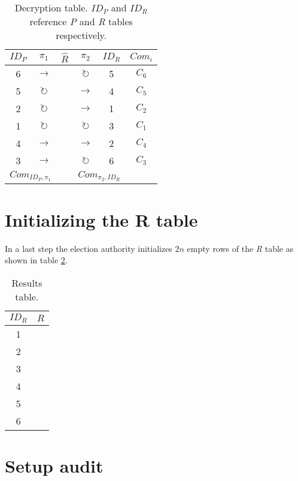 \begin{table}
	\centering
	\begin{tabular}{|c|c|c|c|c|c|}
		\hline
		$ID_P$ & $\pi_1$ & $\hat{R}$ & $\pi_2$ & $ID_R$ & $Com_{i}$ \\
		\hline
		6 & $\rightarrow$       & & $\circlearrowright$ & 5 & $C_6$ \\
		5 & $\circlearrowright$ & & $\rightarrow$       & 4 & $C_5$ \\
		2 & $\circlearrowright$ & & $\rightarrow$       & 1 & $C_2$ \\
		1 & $\circlearrowright$ & & $\circlearrowright$ & 3 & $C_1$ \\
		4 & $\rightarrow$       & & $\rightarrow$       & 2 & $C_4$ \\
		3 & $\rightarrow$       & & $\circlearrowright$ & 6 & $C_3$ \\
		\hline
		\multicolumn{2}{|c|}{$Com_{ID_P, \pi_1}$} &   & \multicolumn{2}{c|}{$Com_{\pi_2, ID_R}$} & \\
		\hline
	\end{tabular}
	\caption{Decryption table. $ID_P$ and $ID_R$ reference \emph{P} and \emph{R} tables respectively.}
	\label{tbl:d_table_full}
\end{table}

\section{Initializing the \textbf{R} table}

In a last step the election authority initializes $2n$ empty rows of the
\emph{R} table as shown in table \ref{tbl:r_table_full}.

\begin{table}
	\centering
	\begin{tabular}{|c|c|}
		\hline
		$ID_R$ & $R$ \\
		\hline
		1 & \\
		2 & \\
		3 & \\
		4 & \\
		5 & \\
		6 & \\
		\hline
	\end{tabular}
	\caption{Results table.}
	\label{tbl:r_table_full}
\end{table}

\section{Setup audit}

